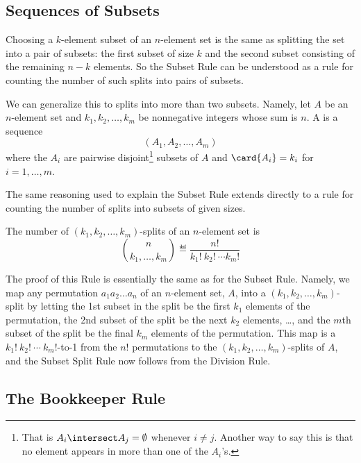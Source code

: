 \label{bookkeeper_sec}

\subsection{Sequences of Subsets}

Choosing a $k$-element subset of an $n$-element set is the same as
splitting the set into a pair of subsets: the first subset of size $k$ and
the second subset consisting of the remaining $n-k$ elements.  So the
Subset Rule can be understood as a rule for counting the number of such
splits into pairs of subsets.

We can generalize this to splits into more than two subsets.  Namely, let
$A$ be an $n$-element set and $k_1,k_2, \dots, k_m$ be nonnegative integers
whose sum is $n$.  A  is a
sequence
\[
(A_1, A_2,\dots,A_m)
\]
where the $A_i$ are pairwise disjoint\footnote{That is $A_i \intersect A_j
 = \emptyset$ whenever $i \neq j$.  Another way to say this is that no
element appears in more than one of the $A_i$'s.} subsets of $A$ and
$\card{A_i} = k_i$ for $i=1,\dots,m$.

The same reasoning used to explain the Subset Rule extends directly to a
rule for counting the number of splits into subsets of given sizes.

\begin{mathrule}
The number of $(k_1,k_2, \dots, k_m)$-splits of an $n$-element set is
\[
\binom{n}{k_1,\dots,k_m} \eqdef \frac{n!}{k_1!\ k_2!\ \cdots k_m!}
\]
\end{mathrule}

The proof of this Rule is essentially the same as for the Subset Rule.
Namely, we map any permutation $a_1a_2\dots a_n$ of an $n$-element set,
$A$, into a $(k_1,k_2, \dots, k_m)$-split by letting the 1st subset in the
split be the first $k_1$ elements of the permutation, the 2nd subset of
the split be the next $k_2$ elements, \dots, and the $m$th subset of the
split be the final $k_m$ elements of the permutation.  This map is a
$k_1!\ k_2!\ \cdots\ k_m!$-to-1 from the $n!$ permutations to the
$(k_1,k_2, \dots, k_m)$-splits of $A$, and the Subset Split Rule now
follows from the Division Rule.

\subsection{The Bookkeeper Rule}

